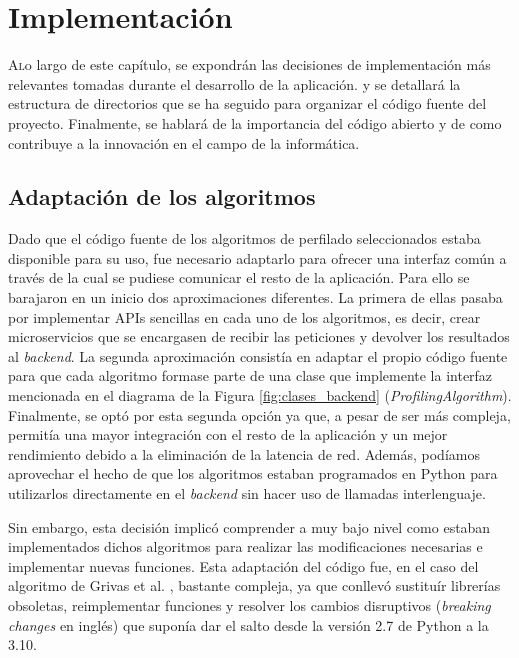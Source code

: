 \chapter{Implementación}
\label{chap:implementacion}

\lettrine{A} lo largo de este capítulo, se expondrán las decisiones de implementación más relevantes tomadas durante el desarrollo de la aplicación.
y se detallará la estructura de directorios que se ha seguido para organizar el código fuente del proyecto. Finalmente, se hablará
de la importancia del código abierto y de como contribuye a la innovación en el campo de la informática.

\section{Adaptación de los algoritmos}
\label{sec:adaptacion_algoritmos}

Dado que el código fuente de los algoritmos de perfilado seleccionados estaba disponible para su uso, fue necesario adaptarlo
para ofrecer una interfaz común a través de la cual se pudiese comunicar el resto de la aplicación.
Para ello se barajaron en un inicio dos aproximaciones diferentes. La primera de ellas pasaba
por implementar APIs sencillas en cada uno de los algoritmos, es decir, crear microservicios que se encargasen de recibir
las peticiones y devolver los resultados al \textit{backend}. La segunda aproximación consistía en adaptar el propio código
fuente para que cada algoritmo formase parte de una clase que implemente la interfaz mencionada en el diagrama de la Figura \ref{fig:clases_backend}
(\textit{ProfilingAlgorithm}). Finalmente, se optó por esta segunda opción ya que, a pesar de ser más compleja, permitía
una mayor integración con el resto de la aplicación y un mejor rendimiento debido a la eliminación de la latencia de red. Además,
podíamos aprovechar el hecho de que los algoritmos estaban programados en Python para utilizarlos directamente
en el \textit{backend} sin hacer uso de llamadas interlenguaje.

\bigskip
Sin embargo, esta decisión implicó comprender a muy bajo nivel como estaban implementados dichos algoritmos para realizar las modificaciones necesarias
e implementar nuevas funciones. Esta adaptación del código fue, en el caso del algoritmo de Grivas et al. \cite{grivas2015author},
bastante compleja, ya que conllevó sustituír librerías obsoletas, reimplementar funciones y resolver los cambios disruptivos (\textit{breaking changes} en inglés) que suponía
dar el salto desde la versión 2.7 de Python a la 3.10.

